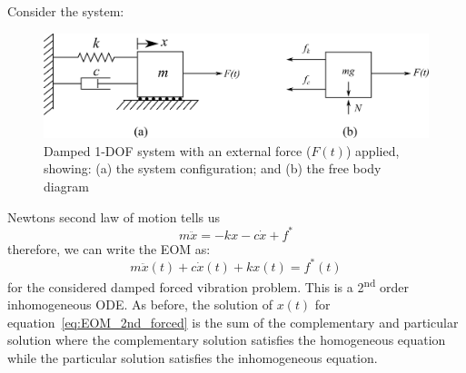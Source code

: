 \documentclass[12pt,letter]{article}
\begin{document}
Consider the system:
\begin{figure}[H]
	\centering
	\includegraphics[]{../figures/1-DOF-spring_dashpot_mass_horizontal_forced_FBD.png}
	\caption{Damped 1-DOF system with an external force ($F(t)$) applied, showing: (a) the system configuration; and (b) the free body diagram}
\end{figure}
Newtons second law of motion tells us
\begin{equation}
m \ddot{x} = -kx - c\dot{x} + f^*
\end{equation}
therefore, we can write the EOM as:
\begin{equation}
m \ddot{x}(t) + c\dot{x}(t) + kx(t) = f^*(t)
\label{eq:EOM_2nd_forced}
\end{equation}
for the considered damped forced vibration problem. This is a 2\textsuperscript{nd} order inhomogeneous ODE. As before, the solution of $x(t)$ for equation~\ref{eq:EOM_2nd_forced} is the sum of the complementary and particular solution where the complementary solution satisfies the homogeneous equation while the particular solution satisfies the inhomogeneous equation. 
\end{document}
